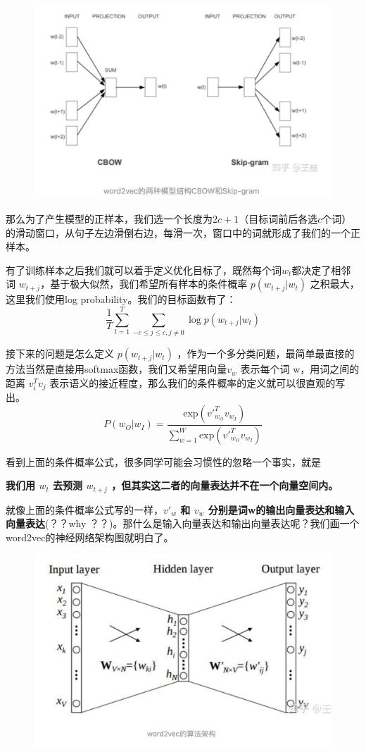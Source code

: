 \documentclass[12pt]{article}
\begin{document}
\begin{figure}[H]
    \centering
    \includegraphics[width=.8\textwidth]{fig/Embedding_Word2vec_Skip-gram_CBOW.png}
\end{figure}

那么为了产生模型的正样本，我们选一个长度为$2c+1$（目标词前后各选$c$个词）的滑动窗口，从句子左边滑倒右边，每滑一次，窗口中的词就形成了我们的一个正样本。

有了训练样本之后我们就可以着手定义优化目标了，既然每个词$w_t$都决定了相邻词 $w_{t+j}$，基于极大似然，我们希望所有样本的条件概率 $p(w_{t+j}|w_t)$ 之积最大，这里我们使用log probability。我们的目标函数有了：
$$
\frac{1}{T} \sum_{t=1}^T\sum_{-c \le j \le c, j \neq 0} \log{p(w_{t+j}|w_t)}
$$

接下来的问题是怎么定义 $p(w_{t+j}|w_t)$ ，作为一个多分类问题，最简单最直接的方法当然是直接用softmax函数，我们又希望用向量$v_w$ 表示每个词 w，用词之间的距离 $v_i^Tv_j$ 表示语义的接近程度，那么我们的条件概率的定义就可以很直观的写出。
$$
P(w_O|w_I) = \frac{\text{exp}({v'}_{w_O}^Tv_{w_I})}{\sum_{w=1}^W\text{exp}({{v'}_{w_O}^Tv_{w_I}})}
$$

看到上面的条件概率公式，很多同学可能会习惯性的忽略一个事实，就是

\textbf{我们用 $w_t$ 去预测 $w_{t+j}$ ，但其实这二者的向量表达并不在一个向量空间内。}

就像上面的条件概率公式写的一样，\textbf{$v'_w$ 和 $v_w$ 分别是词w的输出向量表达和输入向量表达}(？？why ？？)。那什么是输入向量表达和输出向量表达呢？我们画一个word2vec的神经网络架构图就明白了。
\begin{figure}[H]
    \centering
    \includegraphics[width=.8\textwidth]{fig/Word2Vec_Algorithm_Structure.png}
\end{figure}
\end{document}
